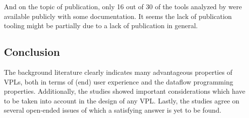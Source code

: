 





And on the topic of publication, only 16 out of 30 of the tools analyzed by \citet{kuhail_characterizing_2021} were available publicly with some documentation.
It seems the lack of publication tooling might be partially due to a lack of publication in general. 

\subsection{Conclusion}

The background literature clearly indicates many advantageous properties of VPLs, both in terms of (end) user experience and the dataflow programming properties. 
Additionally, the studies showed important considerations which have to be taken into account in the design of any VPL.  
Lastly, the studies agree on several open-ended issues of which a satisfying answer is yet to be found. 


